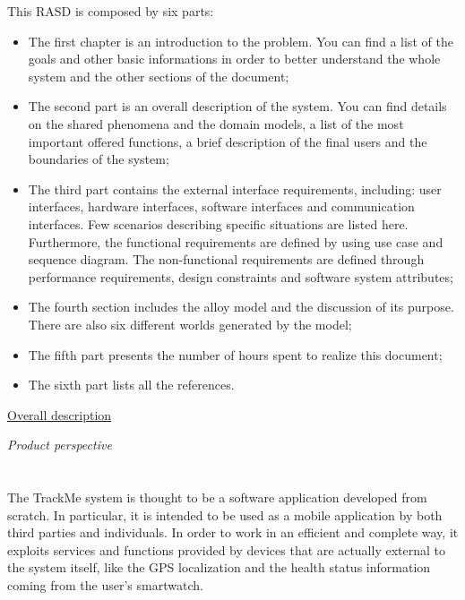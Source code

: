 \documentclass{article}
\begin{document}
\begin{legal}
\begin{legal}
		{\normalfont
This RASD is composed by six parts:
		\begin{itemize}
		\item The first chapter is an introduction to the problem. You can find a list of the goals and other basic informations in order to better understand the whole system and the other sections of the document;\\
		\item The second part is an overall description of the system. You can find details on the shared phenomena and the domain models, a list of the most important offered functions, a brief description of the final users and the boundaries of the system;\\
		\item The third part contains the external interface requirements, including: user interfaces, hardware interfaces, software interfaces and communication interfaces. Few scenarios describing specific situations are listed here. Furthermore, the functional requirements are defined by using use case and sequence diagram. The non-functional requirements are defined through performance requirements, design constraints and software system attributes;\\
		\item The fourth section includes the alloy model and the discussion of its purpose. There are also six different worlds generated by the model;\\
		\item The fifth part presents the number of hours spent to realize this document;\\
		\item The sixth part lists all the references.\\
		\end{itemize}
		}		
		\end{legal}
		\newpage
  	\item \underline{Overall description}
  		\begin{legal}
    		\item \textit{Product perspective}\\\\
			{\normalfont \\
The TrackMe system is thought to be a software application developed from scratch. In particular, it is intended to be used as a mobile application by both third parties and individuals.
In order to work in an efficient and complete way, it exploits services and functions provided by devices that are actually external to the system itself, like the GPS 				localization and the health status information coming from the user’s smartwatch.
}
\end{legal}
\end{legal}
\end{document}
